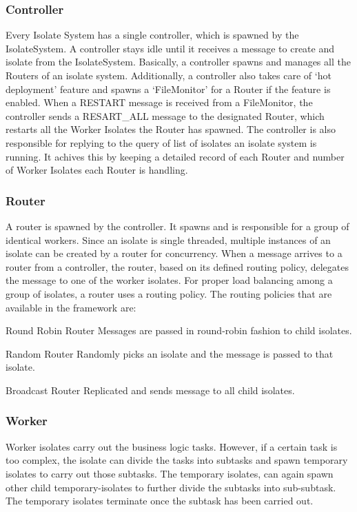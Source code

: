   \subsubsection{Controller}
  Every Isolate System has a single controller, which is spawned by the IsolateSystem. A controller stays idle until it receives a message to create and isolate from the IsolateSystem. Basically, a controller spawns and manages all the Routers of an isolate system. Additionally, a controller also takes care of ‘hot deployment’ feature and spawns a ‘FileMonitor’ for a Router if the feature is enabled. When a RESTART message is received from a FileMonitor, the controller sends a RESART_ALL message to the designated Router, which restarts all the Worker Isolates the Router has spawned.
  The controller is also responsible for replying to the query of list of isolates an isolate system is running. It achives this by keeping a detailed record of each Router and number of Worker Isolates each Router is handling.

  \subsubsection{Router}
  A router is spawned by the controller. It spawns and is responsible for a group of identical workers. Since an isolate is single threaded, multiple instances of an isolate can be created by a router for concurrency. When a message arrives to a router from a controller, the router, based on its defined routing policy, delegates the message to one of the worker isolates.
  For proper load balancing among a group of isolates, a router uses a routing policy. The routing policies that are available in the framework are:

  \begin{description}
    \item{Round Robin Router} Messages are passed in round-robin fashion to child isolates.

    \item{Random Router} Randomly picks an isolate and the message is passed to that isolate.

    \item{Broadcast Router} Replicated and sends message to all child isolates.
  \end{description}

  \subsubsection{Worker}
  Worker isolates carry out the business logic tasks. However, if a certain task is too complex, the isolate can divide the tasks into subtasks and spawn temporary isolates to carry out those subtasks. The temporary isolates, can again spawn other child temporary-isolates to further divide the subtasks into sub-subtask. The temporary isolates terminate once the subtask has been carried out.

